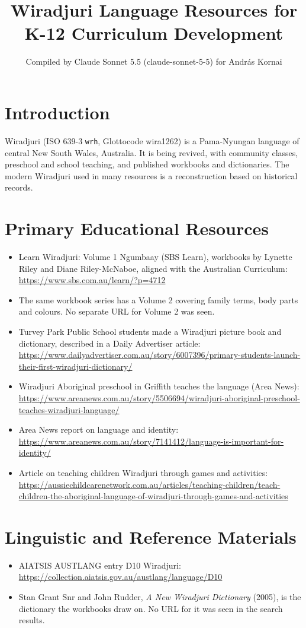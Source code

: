 \documentclass[12pt]{article}
\title{Wiradjuri Language Resources for K-12 Curriculum Development}
\author{Compiled by Claude Sonnet 5.5 (claude-sonnet-5-5) for Andr\'as Kornai}
\date{}
\begin{document}
\maketitle

\section{Introduction}
Wiradjuri (ISO 639-3 \texttt{wrh}, Glottocode wira1262) is a Pama-Nyungan language of central New South Wales, Australia. It is being revived, with community classes, preschool and school teaching, and published workbooks and dictionaries. The modern Wiradjuri used in many resources is a reconstruction based on historical records.

\section{Primary Educational Resources}
\begin{itemize}
\item Learn Wiradjuri: Volume 1 Ngumbaay (SBS Learn), workbooks by Lynette Riley and Diane Riley-McNaboe, aligned with the Australian Curriculum: \url{https://www.sbs.com.au/learn/?p=4712}
\item The same workbook series has a Volume 2 covering family terms, body parts and colours. No separate URL for Volume 2 was seen.
\item Turvey Park Public School students made a Wiradjuri picture book and dictionary, described in a Daily Advertiser article: \url{https://www.dailyadvertiser.com.au/story/6007396/primary-students-launch-their-first-wiradjuri-dictionary/}
\item Wiradjuri Aboriginal preschool in Griffith teaches the language (Area News): \url{https://www.areanews.com.au/story/5506694/wiradjuri-aboriginal-preschool-teaches-wiradjuri-language/}
\item Area News report on language and identity: \url{https://www.areanews.com.au/story/7141412/language-is-important-for-identity/}
\item Article on teaching children Wiradjuri through games and activities: \url{https://aussiechildcarenetwork.com.au/articles/teaching-children/teach-children-the-aboriginal-language-of-wiradjuri-through-games-and-activities}
\end{itemize}

\section{Linguistic and Reference Materials}
\begin{itemize}
\item AIATSIS AUSTLANG entry D10 Wiradjuri: \url{https://collection.aiatsis.gov.au/austlang/language/D10}
\item Stan Grant Snr and John Rudder, \emph{A New Wiradjuri Dictionary} (2005), is the dictionary the workbooks draw on. No URL for it was seen in the search results.
\end{itemize}
\end{document}
